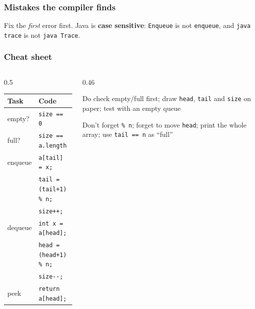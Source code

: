 \documentclass[aspectratio=169,10pt,compress]{beamer}
\begin{document}
\begin{frame}[t,fragile] \frametitle{Mistakes the compiler finds}

  \vspace{0.1em}
  \small
  Fix the \emph{first} error first. Java is \textbf{case sensitive}: \texttt{Enqueue} is not \texttt{enqueue}, and \texttt{java trace} is not \texttt{java Trace}.
\end{frame}





\begin{frame}[t,fragile] \frametitle{Cheat sheet}
  \begin{columns}[T]
    \begin{column}{0.5\textwidth}
      \begin{center}\small
      \begin{tabular}{ll}
        \toprule
        \textbf{Task} & \textbf{Code} \\
        \midrule
        empty?   & \texttt{size == 0} \\
        full?    & \texttt{size == a.length} \\
        enqueue  & \texttt{a[tail] = x;}\\
                 & \texttt{tail = (tail+1) \% n;}\\
                 & \texttt{size++;}\\
        dequeue  & \texttt{int x = a[head];}\\
                 & \texttt{head = (head+1) \% n;}\\
                 & \texttt{size-{}-;}\\
        peek     & \texttt{return a[head];} \\
        \bottomrule
      \end{tabular}
      \end{center}
    \end{column}
    \begin{column}{0.46\textwidth}
      \begin{block}{Do}
        \small check empty/full first; draw \texttt{head}, \texttt{tail} and \texttt{size} on paper; test with an empty queue
      \end{block}
      \begin{block}{Don't}
        \small forget \texttt{\% n}; forget to move \texttt{head}; print the whole array; use \texttt{tail == n} as ``full''
      \end{block}
    \end{column}
  \end{columns}
\end{frame}
\end{document}
